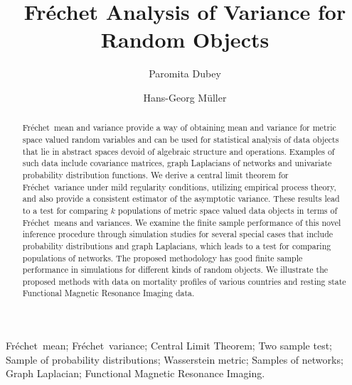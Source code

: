 \documentclass[lineno]{biometrika}
\def\F{Fr\'{e}chet}
\begin{document}



\title{Fr\'echet Analysis of Variance for Random Objects}
\author{Paromita Dubey}


\author{Hans-Georg M\"uller}

\maketitle

\begin{abstract}
		\F \ mean and variance provide a way of obtaining mean and variance for metric space valued random variables and can be used for statistical analysis of  data objects that lie in abstract spaces devoid of algebraic structure and operations. Examples of such data include covariance matrices, graph Laplacians of networks and univariate probability distribution functions. We derive a central limit theorem for \F \ variance under mild regularity conditions,  utilizing empirical process theory,  and also provide a consistent estimator of the asymptotic variance. These results lead to  a  test for comparing $k$ populations of metric space valued data objects in terms of \F \ means and variances. We examine the finite sample performance of this novel inference procedure through simulation studies for several special cases that include probability distributions and graph Laplacians, which leads to a test for comparing  populations of networks. The proposed methodology has good finite sample performance in simulations  for different kinds of random objects.  %
		We illustrate the proposed  methods with  data on mortality profiles of various countries  and  resting state Functional Magnetic Resonance Imaging data.
\end{abstract}


\begin{keywords}  \F \ mean; \F \ variance;  Central Limit Theorem; Two sample test; Sample of probability distributions; Wasserstein metric;  Samples of networks; Graph Laplacian; Functional Magnetic Resonance Imaging.
 \end{keywords}
\end{document}
